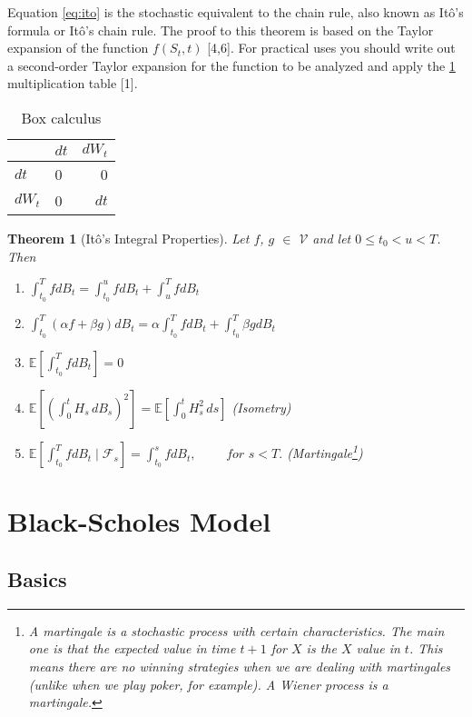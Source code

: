 \documentclass[12pt,twoside]{reedthesis}
\newtheorem{theorem}{Theorem}[section]
\theoremstyle{definition}
\theoremstyle{definition}
\theoremstyle{remark}
\begin{document}
  Equation \eqref{eq:ito} is the stochastic equivalent to the chain rule,
  also known as Itô's formula or Itô's chain rule. The proof to this
  theorem is based on the Taylor expansion of the function \(f(S_t, t)\)
  {[}4,6{]}. For practical uses you should write out a second-order Taylor
  expansion for the function to be analyzed and apply the
  \ref{tab:box-calc} multiplication table {[}1{]}.
  \begin{longtable}[t]{llr}
  \caption{\label{tab:box-calc}Box calculus}\\
  \toprule
    & $dt$ & $dW_t$\\
  \midrule
  $dt$ & 0 & 0\\
  $dW_t$ & 0 & $dt$\\
  \bottomrule
  \end{longtable}
  \begin{theorem}[Itô's Integral Properties]
  
  Let $f$, $g$ $\in$ $\mathcal{V}$ and let $0 \leq t_0 < u < T$. Then
  \begin{enumerate}[label=(\roman*)]
    \item $\int_{t_0}^{T}{f dB_t} = \int_{t_0}^{u}{f dB_t} + \int_{u}^{T}{f dB_t}$
    \item $\int_{t_0}^{T}{(\alpha f + \beta g) dB_t} = \alpha  \int_{t_0}^{T}{f dB_t} + \int_{t_0}^{T}{ \beta g dB_t}$
    \item $\mathbb{E}\left[ \int_{t_0}^{T}{fdB_t}\right] = 0 $
    \item $\mathbb {E} \left[\left(\int_{0}^{t}H_{s}\,dB_{s}\right)^{2}\right]=\mathbb {E} \left[\int _{0}^{t}H_{s}^{2}\,ds\right]$ (Isometry)
    \item $ \mathbb {E}\left[ \int_{t_0}^{T}{f dB_t \mid \mathcal{F}_{s}} \right] = \int_{t_0}^{s}{f dB_t}, \,\,\,\,\,\,\,\,\,\,\,\,\,\, for \,\, s < T.$  (Martingale\footnote{A martingale is a stochastic process with certain characteristics. The main one is that the expected value in time $t+1$ for $X$ is the $X$ value in $t$. This means there are no winning strategies when we are dealing with martingales (unlike when we play poker, for example). A Wiener process is a martingale.})
  \end{enumerate}
  \end{theorem}
  \section{Black-Scholes Model}\label{black-scholes-model}
  
  \subsection{Basics}\label{basics}
  
\end{document}
